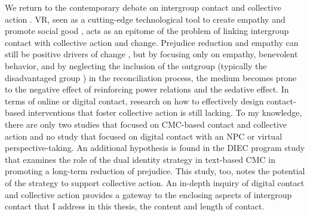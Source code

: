 \documentclass[dissertation,math,vertlayout,pdfa,colorlinks]{aaltoseries}
\begin{document}
We return to the contemporary debate on intergroup contact and collective action \cite{coccoMobilizingSedativeEffects2024}. VR, seen as a cutting-edge technological tool to create empathy and promote social good \cite{nikolaouChangingSocialAttitudes2022}, acts as an epitome of the problem of linking intergroup contact with collective action and change. Prejudice reduction and empathy can still be positive drivers of change \cite{abramsPrejudiceReductionCollective2012}, but by focusing only on empathy, benevolent behavior, and by neglecting the inclusion of the outgroup (typically the disadvantaged group \cite{messeriLandUnrealVirtual2024}) in the reconciliation process, the medium becomes prone to the negative effect of reinforcing power relations and the sedative effect. In terms of online or digital contact, research on how to effectively design contact-based interventions that foster collective action is still lacking. To my knowledge, there are only two studies that focused on CMC-based contact and collective action \cite{enicOnlineContactsSupported2024, schumannWhatCanBe2022} and no study that focused on digital contact with an NPC or virtual perspective-taking. An additional hypothesis is found in the DIEC program study \cite{whiteAchievingTwelvemonthsIntergroup2014} that examines the role of the dual identity strategy in text-based CMC in promoting a long-term reduction of prejudice. This study, too, notes the potential of the strategy to support collective action. An in-depth inquiry of digital contact and collective action provides a gateway to the enclosing aspects of intergroup contact that I address in this thesis, the content and length of contact.
\end{document}
